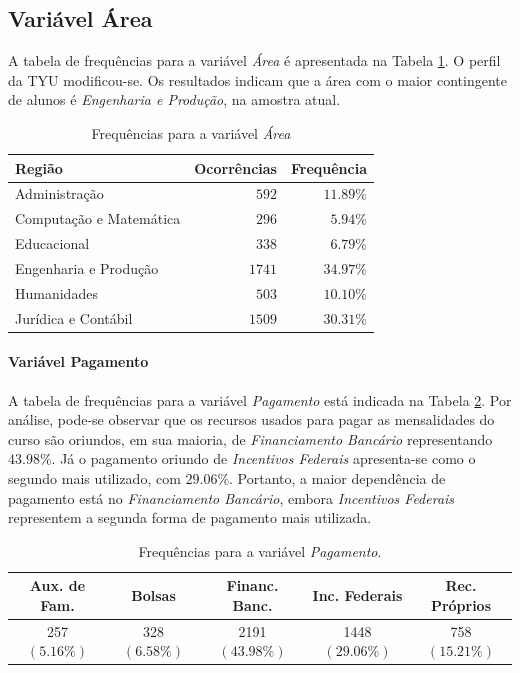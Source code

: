 \documentclass[10pt,a4paper,oneside]{article}
\newcommand{\adm}{Administração\xspace}
\newcommand{\comp}{Computação e Matemática\xspace}
\newcommand{\edu}{Educacional\xspace}
\newcommand{\eng}{Engenharia e Produção\xspace}
\newcommand{\hum}{Humanidades\xspace}
\newcommand{\jur}{Jurídica e Contábil\xspace}
\begin{document}
\subsection*{Variável Área}

A tabela de frequências para a variável \textit{Área} é apresentada na Tabela \ref{table: frequencias area}. O perfil da TYU modificou-se. Os resultados indicam que a área com o maior contingente de alunos é \textit{\eng}, na amostra atual.

\begin{table}[h]
\small
\centering
\caption{Frequências para a variável \textit{Área}}
\label{table: frequencias area}
\vspace{0.5em}
\begin{tabular}{l r r}
	\toprule
	\textbf{Região} & \textbf{Ocorrências} & \textbf{Frequência} \\
	\midrule
	\adm            & $592$                & $11.89\%$           \\
	\comp           & $296$                & $5.94\%$            \\
	\edu            & $338$                & $6.79\%$            \\
	\eng            & $1741$               & $34.97\%$           \\
	\hum            & $503$                & $10.10\%$           \\
	\jur            & $1509$               & $30.31\%$           \\
	\bottomrule
\end{tabular}
\end{table}

\paragraph{Variável Pagamento}

A tabela de frequências para a variável \textit{Pagamento} está indicada na Tabela \ref{table:frequencias-pagamento}. Por análise, pode-se observar que os recursos usados para pagar as mensalidades do curso são oriundos, em sua maioria, de \textit{Financiamento Bancário} representando $43.98\%$. Já o pagamento  oriundo de \textit{Incentivos Federais} apresenta-se como o segundo mais utilizado, com  $29.06\%$.  Portanto, a maior dependência de pagamento está no \textit{Financiamento Bancário}, embora  \textit{Incentivos Federais} representem a segunda forma de pagamento mais utilizada.

\begin{table}[!h]
\centering
\caption{Frequências para a variável \textit{Pagamento}.}
\vspace{0.5em}
\label{table:frequencias-pagamento}
\begin{tabular}{c c c c c}
	\toprule
	\textbf{Aux. de Fam.}    & \textbf{Bolsas}   & \textbf{Financ. Banc.}  & \textbf{Inc. Federais} & \textbf{Rec. Próprios} \\
	\midrule
	257 $(5.16\%)$ & 328 $(6.58\%)$ & 2191 $(43.98\%)$ & 1448 $(29.06\%)$ & 758 $(15.21\%)$ \\
	\bottomrule
\end{tabular}
\end{table}
\end{document}
